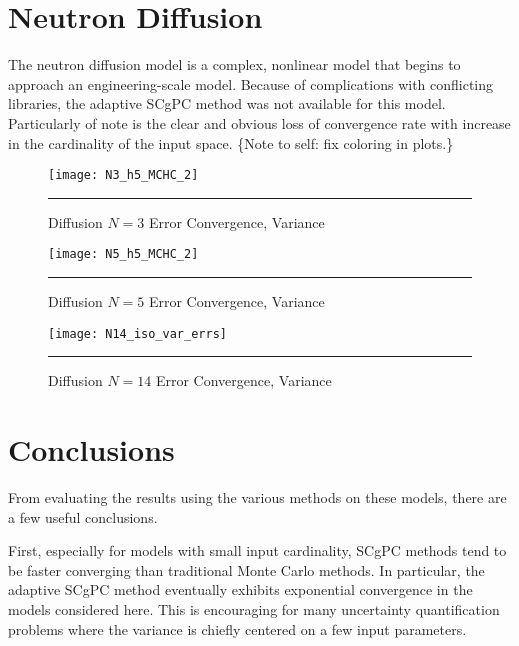 \section{Neutron Diffusion}
The neutron diffusion model is a complex, nonlinear model that begins to approach an engineering-scale model.
Because of complications with conflicting libraries, the adaptive SCgPC method was not available for this
model.  Particularly of note is the clear and obvious loss of convergence rate with increase in the
cardinality of the input space. \{Note to self: fix coloring in plots.\}

\begin{figure}[H]
  \centering
    \texttt{[image: N3\_h5\_MCHC\_2]}
    \rule{35em}{0.5pt}
  \caption{Diffusion $N=3$ Error Convergence, Variance}
  \label{fig:diff3_varconv}
\end{figure}
\begin{figure}[H]
  \centering
    \texttt{[image: N5\_h5\_MCHC\_2]}
    \rule{35em}{0.5pt}
  \caption{Diffusion $N=5$ Error Convergence, Variance}
  \label{fig:diff5_varconv}
\end{figure}
\begin{figure}[H]
  \centering
    \texttt{[image: N14\_iso\_var\_errs]}
    \rule{35em}{0.5pt}
  \caption{Diffusion $N=14$ Error Convergence, Variance}
  \label{fig:diff14_varconv}
\end{figure}





\section{Conclusions}
From evaluating the results using the various methods on these models, there are a few useful conclusions.

First, especially for models with small input cardinality, SCgPC methods tend to be faster converging than
traditional Monte Carlo methods.  In particular, the adaptive SCgPC method eventually exhibits exponential
convergence in the models considered here.  This is encouraging for many uncertainty quantification problems
where the variance is chiefly centered on a few input parameters.


